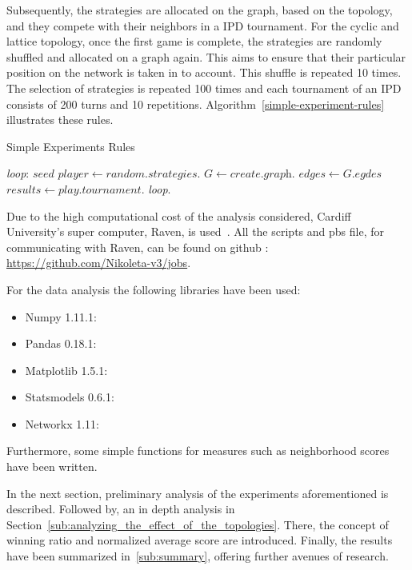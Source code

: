 Subsequently, the strategies are allocated on the graph, based
on the topology, and they compete with their neighbors in a IPD tournament.
For the cyclic and lattice topology, once the first game is complete,
the strategies are randomly shuffled and allocated on a graph again. This aims
to ensure that their particular position on the network is taken in to account.
This shuffle is repeated 10 times. The selection of strategies is repeated 100 times
and each tournament of an IPD consists of 200 turns and 10 repetitions.
Algorithm~\ref{simple-experiment-rules} illustrates these rules.

\begin{algorithm}
	\caption{Simple Experiments Rules}\label{simple-experiment-rules}
	\begin{algorithmic}
		\BState \emph{loop}:
		\State $seed$ 
		\State $player \gets \textit{random.strategies}$.
		\State $G \gets \textit{create.graph}$.
		\State $edges \gets \textit{G.egdes}$
		\State $results \gets \textit{play.tournament}$.
		\emph{loop}.
		\EndFor
		\EndFor
		\EndProcedure
	\end{algorithmic}
\end{algorithm}

Due to the high computational cost of the analysis considered, Cardiff
University's super computer, Raven, is used~\cite{raven}. All the scripts and pbs file, for
communicating with Raven, can be found on github :
\url{https://github.com/Nikoleta-v3/jobs}.

For the data analysis the following libraries have been used:
\begin{multicols}{2}
	\begin{itemize}
		\item Numpy 1.11.1:
		\item Pandas 0.18.1:
		\item Matplotlib 1.5.1:
		\item Statsmodels 0.6.1:
		\item Networkx 1.11:
	\end{itemize}
\end{multicols}

Furthermore, some simple functions for measures such as neighborhood scores
have been written.

In the next section, preliminary analysis of the experiments aforementioned
is described. Followed by, an in depth analysis in Section~\ref{sub:analyzing_the_effect_of_the_topologies}.
There, the concept of winning ratio and normalized average score are introduced.
Finally, the results have been summarized in~\ref{sub:summary}, offering further
avenues of research.

